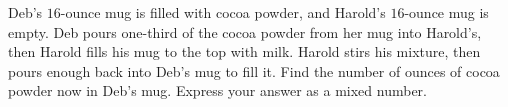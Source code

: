 Deb's $16$-ounce mug is filled with cocoa powder, and Harold's $16$-ounce mug is empty. Deb pours one-third of the cocoa powder from her mug into Harold's, then Harold fills his mug to the top with milk. Harold stirs his mixture, then pours enough back into Deb's mug to fill it. Find the number of ounces of cocoa powder now in Deb's mug. Express your answer as a mixed number.

